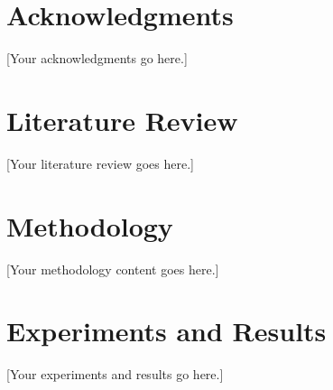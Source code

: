 \documentclass[11pt, letterpaper, oneside]{report}
\begin{document}
\chapter*{Acknowledgments}

[Your acknowledgments go here.]

\clearpage

\tableofcontents
\clearpage

\listoffigures
{}
\clearpage

\listoftables
{}
\clearpage













\chapter{Literature Review}

[Your literature review goes here.]

\chapter{Methodology}

[Your methodology content goes here.]

\chapter{Experiments and Results}

[Your experiments and results go here.]
\end{document}
